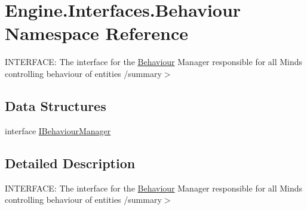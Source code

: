 \hypertarget{a00252}{}\section{Engine.\+Interfaces.\+Behaviour Namespace Reference}
\label{a00252}


I\+N\+T\+E\+R\+F\+A\+CE\+: The interface for the \hyperlink{a00252}{Behaviour} Manager responsible for all Mind\textquotesingle{}s controlling behaviour of entities /summary$>$  


\subsection*{Data Structures}
\begin{DoxyCompactItemize}
\item 
interface \hyperlink{a00418}{I\+Behaviour\+Manager}
\end{DoxyCompactItemize}


\subsection{Detailed Description}
I\+N\+T\+E\+R\+F\+A\+CE\+: The interface for the \hyperlink{a00252}{Behaviour} Manager responsible for all Mind\textquotesingle{}s controlling behaviour of entities /summary$>$ 